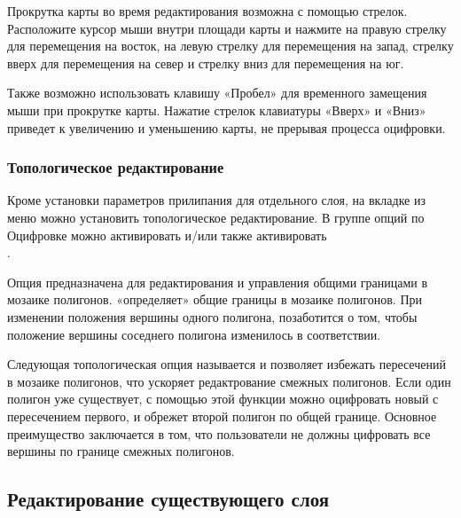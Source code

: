 
Прокрутка карты во время редактирования возможна с помощью стрелок. Расположите
курсор мыши внутри площади карты и нажмите на правую стрелку для перемещения на
восток, на левую стрелку для перемещения на запад, стрелку вверх для перемещения на
север и стрелку вниз для перемещения на юг.

Также возможно использовать клавишу «Пробел» для временного замещения мыши при
прокрутке карты. Нажатие стрелок клавиатуры «Вверх» и «Вниз» приведет к
увеличению и уменьшению карты, не прерывая процесса оцифровки.

\subsubsection{Топологическое редактирование}

Кроме установки параметров прилипания для отдельного слоя, на вкладке 
из меню
 \arrow {}
можно установить топологическое редактирование. В группе опций по Оцифровке
можно активировать  и/или
также активировать \\
.


Опция  предназначена для
редактирования и управления общими границами в мозаике полигонов. \qg
«определяет» общие границы в мозаике полигонов. При изменении положения
вершины одного полигона, \qg позаботится о том, чтобы положение вершины
соседнего полигона изменилось в соответствии.


Следующая топологическая опция называется  и позволяет избежать пересечений в мозаике полигонов, что
ускоряет редактрование смежных полигонов. Если один полигон уже существует,
с помощью этой функции можно оцифровать новый с пересечением первого, и
\qg обрежет второй полигон по общей границе. Основное преимущество заключается
в том, что пользователи не должны цифровать все вершины по границе смежных
полигонов.

\subsection{Редактирование существующего слоя}
\label{sec:edit_existing_layer}


